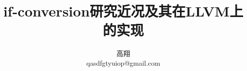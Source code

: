 \documentclass[a4paper]{article}
\begin{document}
\title{if-conversion研究近况及其在LLVM上的实现}
\author{高翔\\qasdfgtyuiop@gmail.com}

\maketitle

\tableofcontents
\setcounter{tocdepth}{3}
\newpage




\begin{small}


\end{small}
\end{document}
